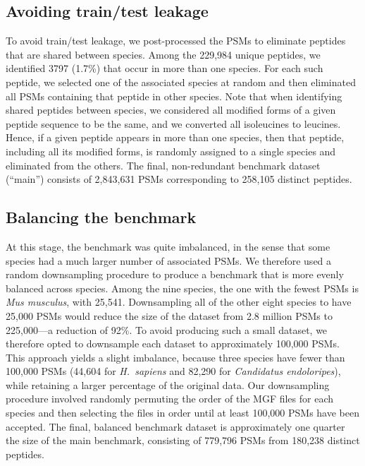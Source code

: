 \documentclass{article}
\begin{document}
\subsection*{Avoiding train/test leakage}

To avoid train/test leakage, we post-processed the PSMs to eliminate peptides that are shared between species.
Among the 229,984 unique peptides, we identified 3797 (1.7\%) that occur in more than one species.
For each such peptide, we selected one of the associated species at random and then eliminated all PSMs containing that peptide in other species.
Note that when identifying shared peptides between species, we considered all modified forms of a given peptide sequence to be the same, and we converted all isoleucines to leucines.
Hence, if a given peptide appears in more than one species, then that peptide, including all its modified forms, is randomly assigned to a single species and eliminated from the others.
The final, non-redundant benchmark dataset (``main'') consists of 2,843,631 PSMs corresponding to 258,105 distinct peptides.

\subsection*{Balancing the benchmark}

At this stage, the benchmark was quite imbalanced, in the sense that some species had a much larger number of associated PSMs.
We therefore used a random downsampling procedure to produce a benchmark that is more evenly balanced across species.
Among the nine species, the one with the fewest PSMs is \textit{Mus musculus}, with 25,541.
Downsampling all of the other eight species to have 25,000 PSMs would reduce the size of the dataset from 2.8 million PSMs to 225,000---a reduction of 92\%.
To avoid producing such a small dataset, we therefore opted to downsample each dataset to approximately 100,000 PSMs.
This approach yields a slight imbalance, because three species have fewer than 100,000 PSMs (44,604 for \textit{H.\ sapiens} and 82,290 for \textit{Candidatus endoloripes}), while retaining a larger percentage of the original data.
Our downsampling procedure involved randomly permuting the order of the MGF files for each species and then selecting the files in order until at least 100,000 PSMs have been accepted.
The final, balanced benchmark dataset is approximately one quarter the size of the main benchmark, consisting of 779,796 PSMs from 180,238 distinct peptides.
\end{document}
